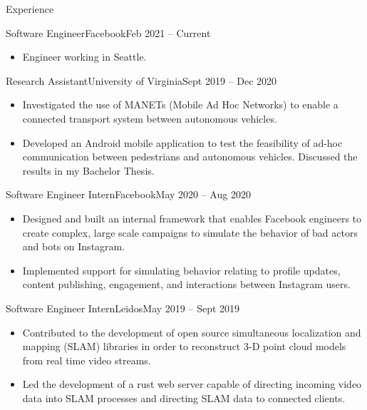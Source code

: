 \documentclass[]{mcdowellcv}
\begin{document}
\makeheader


\begin{cvsection}{Experience}
    \begin{cvsubsection}{Software Engineer}{Facebook}{Feb 2021 -- Current}
        \begin{itemize}%
            \item Engineer working in Seattle.
        \end{itemize}
    \end{cvsubsection}
    \begin{cvsubsection}{Research Assistant}{University of Virginia}{Sept 2019 -- Dec 2020}
        \begin{itemize}%
            \item Investigated the use of MANETs (Mobile Ad Hoc Networks) to enable a connected transport system between autonomous vehicles.
            \item Developed an Android mobile application to test the feasibility of ad-hoc communication between pedestrians and autonomous vehicles. Discussed the results in my Bachelor Thesis.
        \end{itemize}
    \end{cvsubsection}
    \begin{cvsubsection}{Software Engineer Intern}{Facebook}{May 2020 -- Aug 2020}
        \begin{itemize}%
            \item Designed and built an internal framework that enables Facebook engineers to create complex, large scale campaigns to simulate the behavior of bad actors and bots on Instagram.
            \item Implemented support for simulating behavior relating to profile updates, content publishing, engagement, and interactions between Instagram users.
        \end{itemize}
    \end{cvsubsection}

    \begin{cvsubsection}{Software Engineer Intern}{Leidos}{May 2019 -- Sept 2019}
        \begin{itemize}%
            \item Contributed to the development of open source simultaneous localization and mapping (SLAM) libraries in order to reconstruct 3-D point cloud models from real time video streams.
            \item Led the development of a rust web server capable of directing incoming video data into SLAM processes and directing SLAM data to connected clients.
        \end{itemize}
    \end{cvsubsection}
\end{cvsection}
\end{document}
